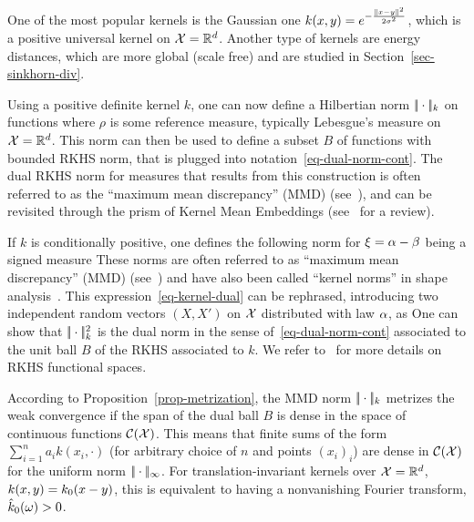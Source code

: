 One of the most popular kernels is the Gaussian one $k(x,y) = e^{-\frac{|\!| x-y |\!|^2}{2 \sigma^2}}$, which is a positive universal kernel on $\mathcal{X}=\mathbb{R}^d$. 
%
Another type of kernels are energy distances, which are more global (scale free) and are studied in Section~\ref{sec-sinkhorn-div}.


Using a positive definite kernel $k$, one can now define a Hilbertian norm $|\!| \cdot |\!|_k$ on functions 
where $\rho$ is some reference measure, typically Lebesgue's measure on $\mathcal{X}=\mathbb{R}^d$. This norm can then be used to define a subset $B$ of functions with bounded RKHS norm,
%
that is plugged into notation~\eqref{eq-dual-norm-cont}. The dual RKHS norm for measures that results from this construction is often referred to as the ``maximum mean discrepancy'' (MMD) (see~\cite{gretton2007kernel}), and can be revisited through the prism of Kernel Mean Embeddings (see~\cite{muandet2017kernel} for a review). 
\fi 


If $k$ is conditionally positive, one defines the following norm for $\xi=\alpha-\beta$ being a signed measure  
These norms are often referred to as ``maximum mean discrepancy'' (MMD) (see~\cite{gretton2007kernel}) and have also been called ``kernel norms'' in shape analysis~\cite{glaunes2004diffeomorphic}.
%
This expression~\eqref{eq-kernel-dual} can be rephrased, introducing two independent random vectors $(X,X')$ on $\mathcal{X}$ distributed with law $\alpha$, as
One can show that $|\!| \cdot |\!|^2_{k}$ is the dual norm in the sense of~\eqref{eq-dual-norm-cont} associated to the unit ball $B$ of the RKHS associated to $k$. We refer to~\cite{berlinet03reproducing,Hofmann2008,scholkopf2002learning} for more details on RKHS functional spaces.  

\begin{rem}
According to Proposition~\ref{prop-metrization}, the MMD norm $|\!| \cdot |\!|_k$ metrizes the weak convergence if the span of the dual ball $B$ is dense in the space of continuous functions $\mathcal{C}(\mathcal{X})$. This means that finite sums of the form $\sum_{i=1}^n a_i k(x_i,\cdot)$ (for arbitrary choice of $n$ and points $(x_i)_i$) are dense in $\mathcal{C}(\mathcal{X})$ for the uniform norm $|\!| \cdot |\!|_\infty$.  For translation-invariant kernels over $\mathcal{X}=\mathbb{R}^d$, $k(x,y)=k_0(x-y)$, this is equivalent to having a nonvanishing Fourier transform, $\hat {k}_0(\omega) >0$.
\end{rem}

